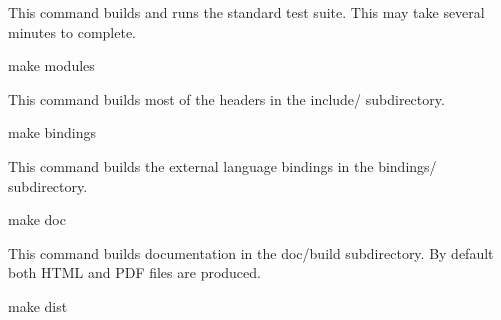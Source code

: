 This command builds and runs the standard test suite. This may take several minutes to complete. \begin{DoxyVerb}make modules
\end{DoxyVerb}


This command builds most of the headers in the {\ttfamily include/} subdirectory. \begin{DoxyVerb}make bindings
\end{DoxyVerb}


This command builds the external language bindings in the {\ttfamily bindings/} subdirectory. \begin{DoxyVerb}make doc
\end{DoxyVerb}


This command builds documentation in the {\ttfamily doc/build} subdirectory. By default both H\-T\-M\-L and P\-D\-F files are produced. \begin{DoxyVerb}make dist\end{DoxyVerb}
 